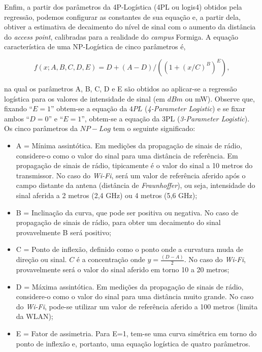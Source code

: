 \documentclass[
	12pt,				%
	twoside,			%
	a4paper,			%
	english,			%
	french,				%
	spanish,			%
	brazil				%
	]{abntex2}
\begin{document}
Enfim, a partir dos parâmetros da 4P-Logística (4PL ou logis4) obtidos
pela regressão, podemos configurar as constantes de sua equação e, a
partir dela, obtiver a estimativa de decaimento do nível de sinal com o
aumento da distância do \emph{access point}, calibradas para a realidade
do \emph{campus} Formiga. A equação característica de uma NP-Logística
de cinco parâmetros é,

\begin{equation}
    f(x; A,B,C,D,E) = D + (A-D) / ( (1+(x/C)^B)^E ),
\end{equation}

\noindent na qual os parâmetros A, B, C, D e E são obtidos ao aplicar-se
a regressão logística para os valores de intensidade de sinal (em
\(dBm\) ou mW). Observe que, fixando ``\(E=1\)'' obtem-se a equação da
\(4PL\) (\emph{4-Parameter Logistic}) e se fixar ambos ``\(D=0\)'' e
``\(E=1\)'', obtem-se a equação da 3PL (\emph{3-Parameter Logistic}). Os
cinco parâmetros da \(NP-Log\) tem o seguinte significado:

\begin{itemize}
\item
  A = Mínima assintótica. Em medições da propagação de sinais de rádio,
  considere-o como o valor do sinal para uma distância de referência. Em
  propagação de sinais de rádio, tipicamente é o valor do sinal a 10
  metros do transmissor. No caso do \emph{Wi-Fi}, será um valor de
  referência aferido após o campo distante da antena (distância de
  \emph{Fraunhoffer}), ou seja, intensidade do sinal aferida a 2 metros
  (2,4 GHz) ou 4 metros (5,6 GHz);
\item
  B = Inclinação da curva, que pode ser positiva ou negativa. No caso de
  propagação de sinais de rádio, para obter um decaimento do sinal
  provavelmente B será positivo;
\item
  C = Ponto de inflexão, definido como o ponto onde a curvatura muda de
  direção ou sinal. \(C\) é a concentração onde \(y = \frac{(D-A)}{2}\).
  No caso do \emph{Wi-Fi}, provavelmente será o valor do sinal aferido
  em torno 10 a 20 metros;
\item
  D = Máxima assintótica. Em medições da propagação de sinais de rádio,
  considere-o como o valor do sinal para uma distância muito grande. No
  caso do \emph{Wi-Fi}, pode-se utilizar um valor de referência aferido
  a 100 metros (limita da WLAN);
\item
  E = Fator de assimetria. Para E=1, tem-se uma curva simétrica em torno
  do ponto de inflexão e, portanto, uma equação logística de quatro
  parâmetros.
\end{itemize}
\end{document}

